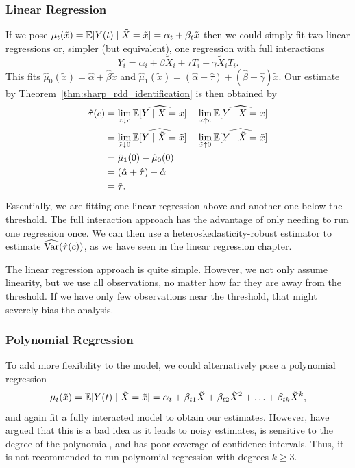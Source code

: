 \documentclass[11pt]{exam}
\begin{document}
\subsubsection{Linear Regression}
If we pose $\mu_t(\tilde x) = \mathbb{E}[Y(t) \mid \tilde X = \tilde x]= \alpha_t + \beta_t \tilde x$ then we could simply fit two linear regressions or, simpler (but equivalent), one regression with full interactions
\[
    Y_i = \alpha_i + \beta \tilde X_i + \tau T_i + \gamma \tilde X_i T_i.
\]
This fits $\hat \mu_0(\tilde x) = \hat \alpha + \hat \beta \tilde x$ and $\hat \mu_1(\tilde x) = (\hat \alpha + \hat \tau) + (\hat \beta + \hat \gamma) \tilde x$. Our estimate by Theorem~\ref{thm:sharp_rdd_identification} is then obtained by
\begin{align*}
    \hat \tau(c) &=  \lim_{x \downarrow c} \widehat{\mathbb{E}[Y \mid X = x]} - \lim_{x \uparrow c} \widehat{\mathbb{E}[Y \mid X = x]}
    \\
    &= \lim_{\tilde x \downarrow 0} \widehat{\mathbb{E}[Y \mid \tilde X = \tilde x]} - \lim_{\tilde x \uparrow 0} \widehat{\mathbb{E}[Y \mid \tilde X = \tilde x]}
    \\
    &= \hat \mu_1(0) - \hat \mu_0(0)
    \\
    &= (\hat \alpha + \hat \tau) - \hat \alpha
    \\
    &= \hat \tau.
\end{align*}
Essentially, we are fitting one linear regression above and another one below the threshold. The full interaction approach has the advantage of only needing to run one regression once. We can then use a heteroskedasticity-robust estimator to estimate $\widehat{\mathrm{Var}}(\hat \tau(c))$, as we have seen in the linear regression chapter.

The linear regression approach is quite simple. However, we not only assume linearity, but we use all observations, no matter how far they are away from the threshold. If we have only few observations near the threshold, that might severely bias the analysis.

\subsubsection{Polynomial Regression}
To add more flexibility to the model, we could alternatively pose a polynomial regression
\[
    \mu_t(\tilde x) = \mathbb{E}[Y(t) \mid \tilde X = \tilde x] = \alpha_t + \beta_{t1}\Tilde{X} +  \beta_{t2}\Tilde{X}^2 + \ldots  + \beta_{tk}\Tilde{X}^k,
\]
and again fit a fully interacted model to obtain our estimates. However, \citet{gelman2019high} have argued that this is a bad idea as it leads to noisy estimates, is sensitive to the degree of the polynomial, and has poor coverage of confidence intervals. Thus, it is not recommended to run polynomial regression with degrees $k \geq 3$.
\end{document}
